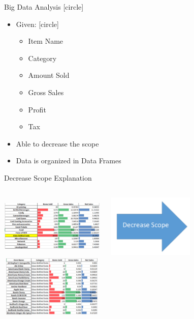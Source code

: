\documentclass[compress,blue]{beamer}
\begin{document}
\begin{frame}{Big Data Analysis}
[circle]
\begin{itemize}
  \item Given:
  [circle] 
  \begin{itemize}
    \item Item Name
    \item Category
    \item Amount Sold
    \item Gross Sales
    \item Profit
    \item Tax
  \end{itemize}  
  \item Able to decrease the scope
  \item Data is organized in Data Frames
\end{itemize}
\end{frame}

\begin{frame}{Decrease Scope Explanation}
\vspace{0cm}
\begin{columns}
\column{\textwidth}
\includegraphics[width=5cm,height=3cm]{FirstPart}
\column{\textwidth}
\includegraphics[width=5cm,height=3cm]{Arrow}
\column{\textwidth}
\includegraphics[width=5cm,height=3cm]{LastPart}
\end{columns}
\end{frame}
\end{document}
